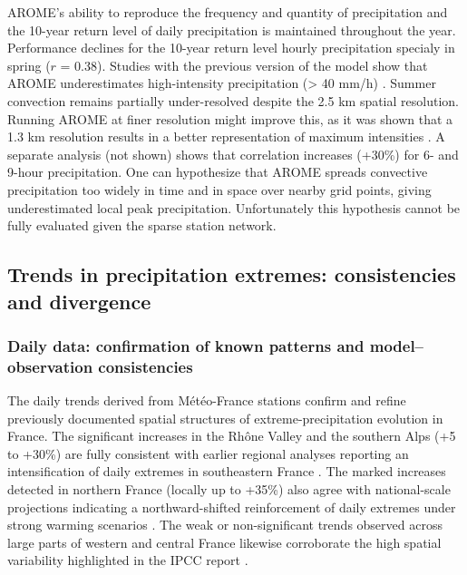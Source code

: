 ﻿\documentclass[hess, manuscript]{copernicus}
\begin{document}
AROME's ability to reproduce the frequency and quantity of precipitation and the 10-year return level of daily precipitation
is maintained throughout the year. Performance declines for the
10-year return level hourly precipitation specialy in spring ($r$ = 0.38).
Studies with the previous version of the model show that AROME underestimates high-intensity precipitation (\textgreater{} 40
mm/h) \citep{Caillaud2021,poncet2024convection}. Summer
convection remains partially under-resolved despite the 2.5 km spatial
resolution. Running AROME at finer resolution might improve this, as it was shown that a 1.3 km resolution results in a better representation of maximum intensities \citep{brousseau-etal-2016}. A separate analysis (not shown) shows that
correlation increases (+30\%) for 6- and 9-hour precipitation.
One can hypothesize that AROME spreads convective precipitation too widely in time and in space over nearby grid points, giving underestimated local peak precipitation. Unfortunately this hypothesis cannot be fully evaluated given the sparse station network. 

\subsection{Trends in precipitation extremes: consistencies and
divergence}\label{trends-in-precipitation-extremes-consistencies-divergences-and-limitations}

\subsubsection{Daily data: confirmation of known patterns and model--observation consistencies}

The daily trends derived from Météo-France stations confirm and refine previously documented spatial structures of extreme-precipitation evolution in France. The significant increases in the Rhône Valley and the southern Alps (+5 to +30\%) are fully consistent with earlier regional analyses reporting an intensification of daily extremes in southeastern France \citep{Blanchet2018,blanchet2021explaining,Ribes2019}. The marked increases detected in northern France (locally up to +35\%) also agree with national-scale projections indicating a northward-shifted reinforcement of daily extremes under strong warming scenarios \citep{soubeyroux:hal-04991790}. The weak or non-significant trends observed across large parts of western and central France likewise corroborate the high spatial variability highlighted in the IPCC report \citep{IPCC2021}.
\end{document}
